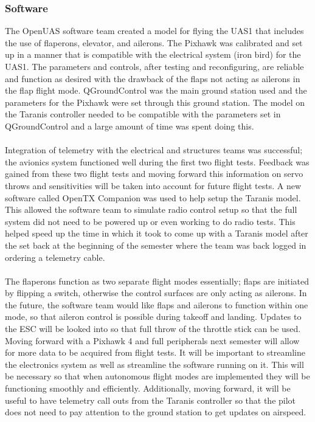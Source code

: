 \documentclass{article}
\begin{document}
\subsubsection{Software}
The OpenUAS software team created a model for flying the UAS1 that includes the use of flaperons, elevator, and ailerons. The Pixhawk was calibrated and set up in a manner that is compatible with the electrical system (iron bird) for the UAS1. The parameters and controls, after testing and reconfiguring, are reliable and function as desired with the drawback of the flaps not acting as ailerons in the flap flight mode. QGroundControl was the main ground station used and the parameters for the Pixhawk were set through this ground station. The model on the Taranis controller needed to be compatible with the parameters set in QGroundControl and a large amount of time was spent doing this.\\\\
Integration of telemetry with the electrical and structures teams was successful; the avionics system functioned well during the first two flight tests. Feedback was gained from these two flight tests and moving forward this information on servo throws and sensitivities will be taken into account for future flight tests. A new software called OpenTX Companion was used to help setup the Taranis model. This allowed the software team to simulate radio control setup so that the full system did not need to be powered up or even working to do radio tests. This helped speed up the time in which it took to come up with a Taranis model after the set back at the beginning of the semester where the team was back logged in ordering a telemetry cable.\\\\  
The flaperons function as two separate flight modes essentially; flaps are initiated by flipping a switch, otherwise the control surfaces are only acting as ailerons. In the future, the software team would like flaps and ailerons to function within one mode, so that aileron control is possible during takeoff and landing. Updates to the ESC will be looked into so that full throw of the throttle stick can be used. Moving forward with a Pixhawk 4 and full peripherals next semester will allow for more data to be acquired from flight tests. It will be important to streamline the electronics system as well as streamline the software running on it. This will be necessary so that when autonomous flight modes are implemented they will be functioning smoothly and efficiently. Additionally, moving forward, it will be useful to have telemetry call outs from the Taranis controller so that the pilot does not need to pay attention to the ground station to get updates on airspeed.\\\\
\end{document}
